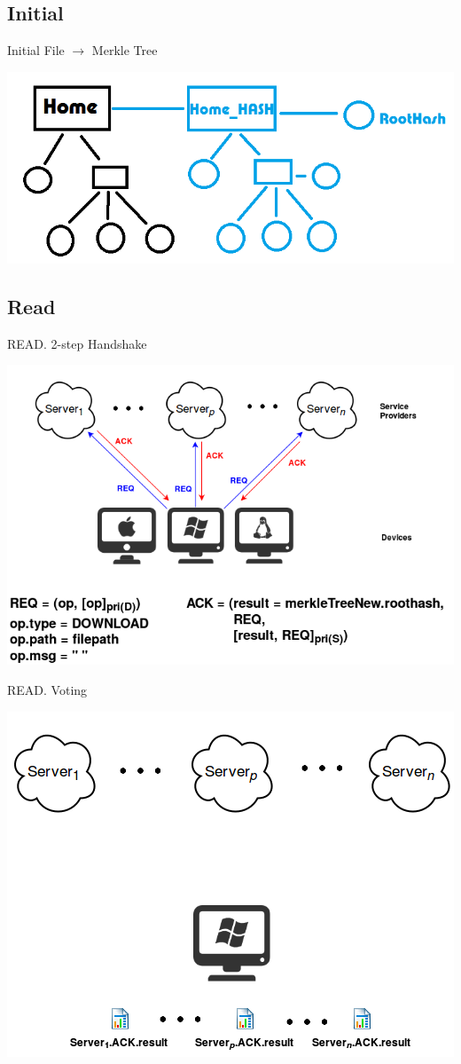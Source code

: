 \documentclass{beamer}
\newcommand{\RNum}[1]{\uppercase\expandafter{\romannumeral #1\relax}}
\begin{document}
\subsection{Initial}
\begin{frame}{Initial}
	\alert{File $\rightarrow$ Merkle Tree}\\
	\begin{center}
	\includegraphics[width=1\textwidth]{init.png}
	\end{center}
\end{frame}

\subsection{Read}
\begin{frame}{READ}{\RNum{1}. 2-step Handshake}
	\begin{center}
	\includegraphics[width=.85\textwidth]{Read1.png}
	\end{center}
\end{frame}

\begin{frame}{READ}{\RNum{2}. Voting}
	\begin{center}
	\includegraphics[width=.65\textwidth]{Read2.png}
	\end{center}
\end{frame}
\end{document}
